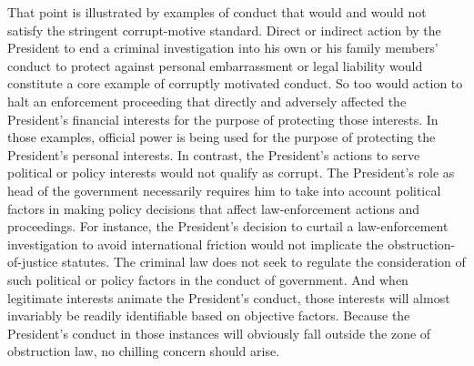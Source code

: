 That point is illustrated by examples of conduct that would and would not satisfy the stringent corrupt-motive standard.
Direct or indirect action by the President to end a criminal investigation into his own or his family members’ conduct to protect against personal embarrassment or legal liability would constitute a core example of corruptly motivated conduct.
So too would action to halt an enforcement proceeding that directly and adversely affected the President’s financial interests for the purpose of protecting those interests.
In those examples, official power is being used for the purpose of protecting the President’s personal interests.
In contrast, the President’s actions to serve political or policy interests would not qualify as corrupt.
The President’s role as head of the government necessarily requires him to take into account political factors in making policy decisions that affect law-enforcement actions and proceedings.
For instance, the President’s decision to curtail a law-enforcement investigation to avoid international friction would not implicate the obstruction-of-justice statutes.
The criminal law does not seek to regulate the consideration of such political or policy factors in the conduct of government.
And when legitimate interests animate the President’s conduct, those interests will almost invariably be readily identifiable based on objective factors.
Because the President’s conduct in those instances will obviously fall outside the zone of obstruction law, no chilling concern should arise.

